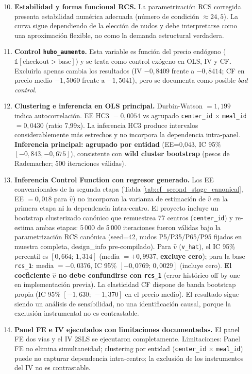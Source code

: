 \documentclass[doc, a4paper, biblatex, floatsintext, longtable, babel]{apa7}
\begin{document}
\begin{enumerate}
    \setcounter{enumi}{9}
    \item \textbf{Estabilidad y forma funcional RCS.} La parametrización RCS corregida presenta estabilidad numérica adecuada (número de condición $ \approx 24,5$). La curva sigue dependiendo de la elección de nudos y debe interpretarse como una aproximación flexible, no como la demanda estructural verdadera.

    \item \textbf{Control \texttt{hubo\_aumento}.} Esta variable es función del precio endógeno ($\mathbb{1}[\text{checkout} > \text{base}]$) y se trata como control exógeno en OLS, IV y CF. Excluirla apenas cambia los resultados (IV $-0,8409$ frente a $-0,8414$; CF en precio medio $-1,5060$ frente a $-1,5041$), pero se documenta como posible \textit{bad control}.

    \item \textbf{Clustering e inferencia en OLS principal.} Durbin-Watson $=1,199$ indica autocorrelación. EE HC3 $=0,0054$ vs agrupado \texttt{center\_id} $\times$ \texttt{meal\_id} $=0,0430$ (ratio 7,99x). La inferencia HC3 produce intervalos considerablemente más estrechos y no incorpora la dependencia intra-panel. \textbf{Inferencia principal: agrupado por entidad} (EE=0,043, IC 95\% $[-0,843,-0,675]$), consistente con \textbf{wild cluster bootstrap} (pesos de Rademacher; 500 iteraciones válidas).

    \item \textbf{Inferencia Control Function con regresor generado.} Los EE convencionales de la segunda etapa (Tabla \ref{tab:cf_second_stage_canonical}, EE $=0,018$ para $\hat{v}$) no incorporan la varianza de estimación de $\hat{v}$ en la primera etapa ni la dependencia intra-centro. El proyecto incluye un bootstrap clusterizado canónico que remuestrea 77 centros (\texttt{center\_id}) y re-estima ambas etapas: 5\,000 de 5\,000 iteraciones fueron válidas bajo la parametrización RCS canónica (seed=42, nudos P5/P35/P65/P95 fijados en muestra completa, design\_info pre-compilado). Para $\hat{v}$ (\texttt{v\_hat}), el IC 95\% percentil es \textbf{$[0,664;\,1,314]$} (media $= +0,9937$, \textbf{excluye cero}); para la base \texttt{rcs\_1}: media $= -0,0376$, IC 95\% $[-0,0769;\,0,0029]$ (incluye cero). \textbf{El coeficiente $\hat{v}$ no debe confundirse con \texttt{rcs\_1}} (error histórico off-by-one en implementación previa). La elasticidad CF dispone de banda bootstrap propia (IC 95\% $[-1,630;\,-1,370]$ en el precio medio). El resultado sigue siendo un análisis de sensibilidad, no una identificación causal, porque la exclusión instrumental no es contrastable.

    \item \textbf{Panel FE e IV ejecutados con limitaciones documentadas.} El panel FE dos vías y el IV 2SLS se ejecutaron completamente. Limitaciones: Panel FE no elimina simultaneidad; clustering por entidad (\texttt{center\_id} $\times$ \texttt{meal\_id}) puede no capturar dependencia intra-centro; la exclusión de los instrumentos del IV no es contrastable.
\end{enumerate}
\end{document}
